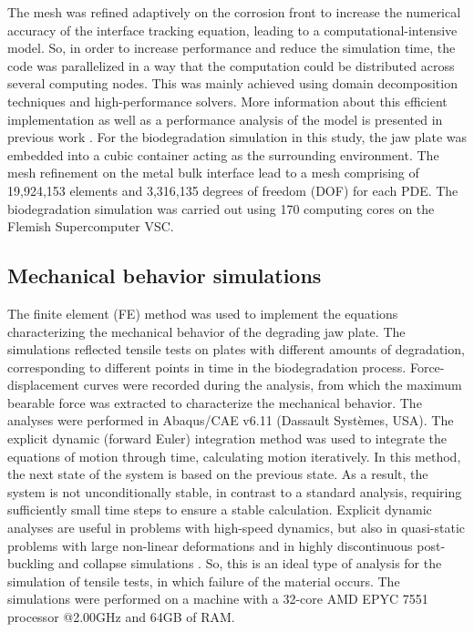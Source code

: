 The mesh was refined adaptively on the corrosion front to increase the numerical accuracy of the interface tracking equation, leading to a computational-intensive model. So, in order to increase performance and reduce the simulation time, the code was parallelized in a way that the computation could be distributed across several computing nodes. This was mainly achieved using domain decomposition techniques and high-performance solvers. More information about this efficient implementation as well as a performance analysis of the model is presented in previous work \cite{Barzegari2022}. For the biodegradation simulation in this study, the jaw plate was embedded into a cubic container acting as the surrounding environment. The mesh refinement on the metal bulk interface lead to a mesh comprising of 19,924,153 elements and 3,316,135 degrees of freedom (\gls{DOF}) for each PDE. The biodegradation simulation was carried out using 170 computing cores on the Flemish Supercomputer VSC.


\subsection{Mechanical behavior simulations}
\label{sec:FEA}

The finite element (FE) method was used to implement the equations characterizing the mechanical behavior of the degrading jaw plate. The simulations reflected tensile tests on plates with different amounts of degradation, corresponding to different points in time in the biodegradation process. Force-displacement curves were recorded during the analysis, from which the maximum bearable force was extracted to characterize the mechanical behavior. The analyses were performed in Abaqus/CAE v6.11 (Dassault Systèmes, USA). The explicit dynamic (forward Euler) integration method was used to integrate the equations of motion through time, calculating motion iteratively. In this method, the next state of the system is based on the previous state. As a result, the system is not unconditionally stable, in contrast to a standard analysis, requiring sufficiently small time steps to ensure a stable calculation. Explicit dynamic analyses are useful in problems with high-speed dynamics, but also in quasi-static problems with large non-linear deformations and in highly discontinuous post-buckling and collapse simulations \cite{explicit2}. So, this is an ideal type of analysis for the simulation of tensile tests, in which failure of the material occurs. The simulations were performed on a machine with a 32-core AMD EPYC 7551 processor @2.00GHz and 64GB of RAM.

